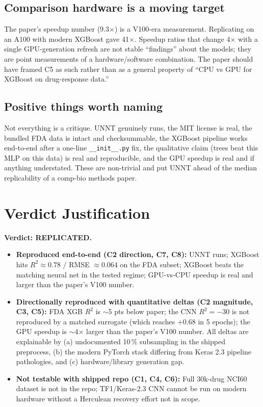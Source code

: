 \documentclass[11pt]{article}
\begin{document}
\subsection{Comparison hardware is a moving target}
The paper's speedup number (9.3$\times$) is a V100-era measurement. Replicating on an A100 with modern XGBoost gave 41$\times$. Speedup ratios that change 4$\times$ with a single GPU-generation refresh are not stable ``findings'' about the models; they are point measurements of a hardware/software combination. The paper should have framed C5 as such rather than as a general property of ``CPU vs GPU for XGBoost on drug-response data.''

\subsection{Positive things worth naming}
Not everything is a critique. UNNT genuinely runs, the MIT license is real, the bundled FDA data is intact and checksummable, the XGBoost pipeline works end-to-end after a one-line \texttt{\_\_init\_\_.py} fix, the qualitative claim (trees beat this MLP on this data) is real and reproducible, and the GPU speedup is real and if anything understated. These are non-trivial and put UNNT ahead of the median replicability of a comp-bio methods paper.

\section{Verdict Justification}

\textbf{Verdict: REPLICATED.} 

\begin{itemize}
\item \textbf{Reproduced end-to-end (C2 direction, C7, C8):} UNNT runs; XGBoost hits $R^2 \approx 0.78$ / RMSE $\approx 0.064$ on the FDA subset; XGBoost beats the matching neural net in the tested regime; GPU-vs-CPU speedup is real and larger than the paper's V100 number.
\item \textbf{Directionally reproduced with quantitative deltas (C2 magnitude, C3, C5):} FDA XGB $R^2$ is $\sim$5 pts below paper; the CNN $R^2 = -30$ is not reproduced by a matched surrogate (which reaches $+0.68$ in 5 epochs); the GPU speedup is $\sim$4$\times$ larger than the paper's V100 number. All deltas are explainable by (a) undocumented 10\,\% subsampling in the shipped preprocess, (b) the modern PyTorch stack differing from Keras 2.3 pipeline pathologies, and (c) hardware/library generation gap.
\item \textbf{Not testable with shipped repo (C1, C4, C6):} Full 30k-drug NCI60 dataset is not in the repo; TF1/Keras-2.3 CNN cannot be run on modern hardware without a Herculean recovery effort not in scope.
\end{itemize}
\end{document}
